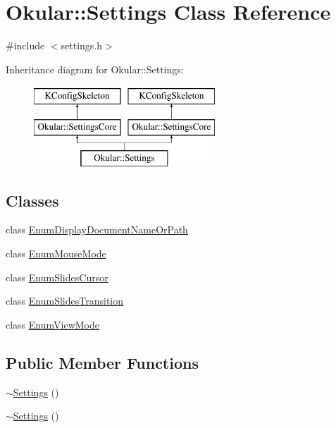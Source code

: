 \hypertarget{classOkular_1_1Settings}{\section{Okular\+:\+:Settings Class Reference}
\label{classOkular_1_1Settings}
}


{\ttfamily \#include $<$settings.\+h$>$}

Inheritance diagram for Okular\+:\+:Settings\+:\begin{figure}[H]
\begin{center}
\leavevmode
\includegraphics[height=3.000000cm]{classOkular_1_1Settings}
\end{center}
\end{figure}
\subsection*{Classes}
\begin{DoxyCompactItemize}
\item 
class \hyperlink{classOkular_1_1Settings_1_1EnumDisplayDocumentNameOrPath}{Enum\+Display\+Document\+Name\+Or\+Path}
\item 
class \hyperlink{classOkular_1_1Settings_1_1EnumMouseMode}{Enum\+Mouse\+Mode}
\item 
class \hyperlink{classOkular_1_1Settings_1_1EnumSlidesCursor}{Enum\+Slides\+Cursor}
\item 
class \hyperlink{classOkular_1_1Settings_1_1EnumSlidesTransition}{Enum\+Slides\+Transition}
\item 
class \hyperlink{classOkular_1_1Settings_1_1EnumViewMode}{Enum\+View\+Mode}
\end{DoxyCompactItemize}
\subsection*{Public Member Functions}
\begin{DoxyCompactItemize}
\item 
\hyperlink{classOkular_1_1Settings_a4a65be5921dfc9fddc476e5320541d89}{$\sim$\+Settings} ()
\item 
\hyperlink{classOkular_1_1Settings_a1581a1e8c31deff39695514651c6627c}{$\sim$\+Settings} ()
\end{DoxyCompactItemize}
